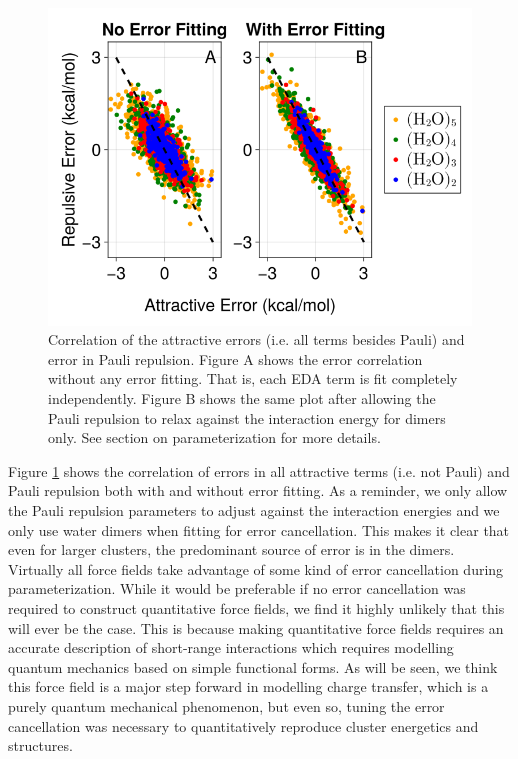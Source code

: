 \documentclass[journal=jacsat,manuscript=article]{achemso}
\begin{document}
\begin{figure}[h]
  \includegraphics*[width=\textwidth]{figures/error_correlation.png}
  \caption{Correlation of the attractive errors (i.e. all terms besides Pauli) and
  error in Pauli repulsion. Figure A shows the error correlation without any error
  fitting. That is, each EDA term is fit completely independently. Figure B shows
  the same plot after allowing the Pauli repulsion to relax against the interaction
  energy for dimers only. See section on parameterization for more details.
}
  \label{fig:error_correlation}
\end{figure}

Figure \ref{fig:error_correlation} shows the correlation of errors in all attractive terms (i.e. not Pauli)
and Pauli repulsion both with and without error fitting. As a reminder, we only allow the Pauli
repulsion parameters to adjust against the interaction energies and we only use water dimers
when fitting for error cancellation. This makes it clear that even for larger clusters, the
predominant source of error is in the dimers. Virtually all force fields take advantage
of some kind of error cancellation during parameterization. While it would be preferable
if no error cancellation was required to construct quantitative force fields, we find it
highly unlikely that this will ever be the case. This is because making quantitative
force fields requires an accurate description of short-range interactions which requires
modelling quantum mechanics based on simple functional forms. As will be seen, we think this
force field is a major step forward in modelling charge transfer, which is a purely
quantum mechanical phenomenon, but even so, tuning the error cancellation was necessary to
quantitatively reproduce cluster energetics and structures.
\end{document}
